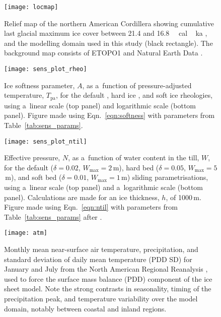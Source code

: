 \documentclass[tc, manuscript]{copernicus}
\begin{document}
\begin{figure*}%
\texttt{[image: locmap]}
\caption{%
      Relief map of the northern American Cordillera showing cumulative last
      glacial maximum ice cover between 21.4 and
      16.8\,\unit{\,cal\,ka} \citep[red line]{Dyke.2004}, and
      the modelling domain used in this study (black rectangle). The
      background map consists of ETOPO1 \citep{Amante.Eakins.2009} and
      Natural Earth Data \citep{Patterson.Kelso.2015}.}
\label{fig:locmap}%
\end{figure*}%


\begin{figure}%
\texttt{[image: sens\_plot\_rheo]}
\caption{%
      Ice softness parameter, $A$, as a~function of pressure-adjusted
      temperature, $T_{\text{pa}}$, for the default
      \citep{Paterson.Budd.1982}, hard ice \citep[with
      $E_{\text{SIA}}=1$]{Cuffey.Paterson.2010}, and soft ice \citep[with
      $E_{\text{SIA}}=5$]{Cuffey.Paterson.2010} rheologies, using a~linear
      scale (top panel) and logarithmic scale (bottom panel). Figure made
      using Eqn.~\ref{eqn:softness} with parameters from
      Table~\ref{tab:sens_params}.}
\label{fig:sens_plot_rheo}%
\end{figure}%


\begin{figure}%
\texttt{[image: sens\_plot\_ntil]}
\caption{%
      Effective pressure, $N$, as a~function of water content in the till,
      $W$, for the default ($\delta=0.02$, $W_{\text{max}}=2$\,m), hard bed
      ($\delta=0.05$, $W_{\text{max}}=5$\,m), and soft bed ($\delta=0.01$,
      $W_{\text{max}}=1$\,m) sliding parametrisations, using a~linear scale
      (top panel) and a~logarithmic scale (bottom panel). Calculations are
      made for an ice thickness, $h$, of 1000\,m. Figure made using
      Eqn.~\ref{eqn:ntil} with parameters from Table~\ref{tab:sens_params}
      after \citet[Fig.~1]{Bueler.Pelt.2015}.}
\label{fig:sens_plot_ntil}%
\end{figure}%


\begin{figure}%
\texttt{[image: atm]}
\caption{%
      Monthly mean near-surface air temperature, precipitation, and standard
      deviation of daily mean temperature (PDD SD) for January and July from
      the North American Regional Reanalysis
      \citep[NARR;][]{Mesinger.etal.2006}, used to force the surface mass
      balance (PDD) component of the ice sheet model. Note the strong
      contrasts in seasonality, timing of the precipitation peak, and
      temperature variability over the model domain, notably between coastal
      and inland regions.}
\label{fig:atm}%
\end{figure}%
\end{document}
